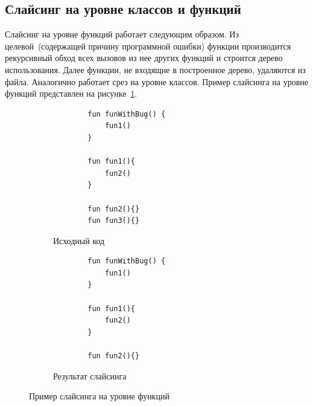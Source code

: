 \subsection{Слайсинг на уровне классов и функций}
Слайсинг на уровне функций работает следующим образом. Из целевой~(содержащей причину программной ошибки) функции производится рекурсивный обход всех вызовов из нее других функций и строится дерево использования. Далее функции, не входящие в построенное дерево, удаляются из файла. Аналогично работает срез на уровне классов. Пример слайсинга на уровне функций представлен на рисунке~\ref{funslicing}.
%
\begin{figure}[]
\centering
\begin{subfigure}[t]{\linewidth}
	\begin{lstlisting}
		fun funWithBug() {
			fun1()
		}
		
		fun fun1(){
			fun2()		
		}
		
		fun fun2(){}
		fun fun3(){}
	\end{lstlisting}
	\caption{Исходный код}
\end{subfigure}
\begin{subfigure}[t]{\linewidth}
	\begin{lstlisting}
		fun funWithBug() {
			fun1()
		}
		
		fun fun1(){
			fun2()		
		}
		
		fun fun2(){}
	\end{lstlisting}
	\caption{Результат слайсинга}
\end{subfigure}
	\caption{\label{funslicing}Пример слайсинга на уровне функций}
\end{figure}

